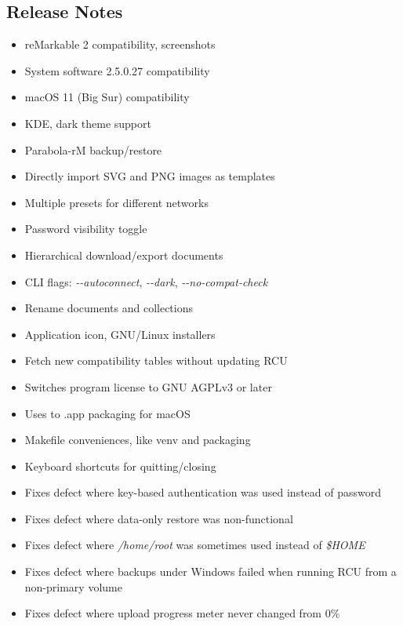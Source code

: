\documentclass{memoir}
\begin{document}
{{\subsection{Release Notes}
\begin{itemize}
\item{reMarkable 2 compatibility, screenshots}
  \item{System software 2.5.0.27 compatibility}
  \item{macOS 11 (Big Sur) compatibility}
  \item{KDE, dark theme support}
    \item{Parabola-rM backup/restore}
  \item{Directly import SVG and PNG images as templates}
  \item{Multiple presets for different networks}
  \item{Password visibility toggle}
  \item{Hierarchical download/export documents}
  \item{CLI flags: \textit{\--\--autoconnect}, \textit{\--\--dark}, \textit{\--\--no-compat-check}}
  \item{Rename documents and collections}
  \item{Application icon, GNU/Linux installers}
  \item{Fetch new compatibility tables without updating RCU}
  \item{Switches program license to GNU AGPLv3 or later}
  \item{Uses to .app packaging for macOS}
  \item{Makefile conveniences, like venv and packaging}
  \item{Keyboard shortcuts for quitting/closing}
  \item{Fixes defect where key-based authentication was used instead of password}
  \item{Fixes defect where data-only restore was non-functional}
  \item{Fixes defect where \textit{/home/root} was sometimes used instead of \textit{\$HOME}}
  \item{Fixes defect where backups under Windows failed when running RCU from a non-primary volume}
  \item{Fixes defect where upload progress meter never changed from 0\%}
\end{itemize}

}}
\end{document}
